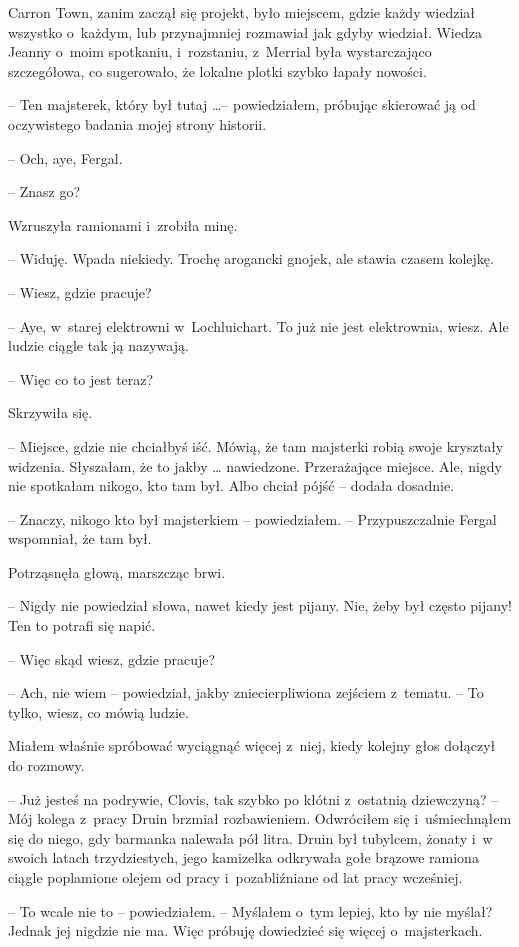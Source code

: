 \documentclass[oneside,polish,11pt,sfheadings]{mwbk}
\begin{document}
Carron Town, zanim zaczął się projekt, było miejscem, gdzie każdy
wiedział wszystko o~każdym, lub przynajmniej rozmawiał jak gdyby
wiedział. Wiedza Jeanny o~moim spotkaniu, i~rozstaniu, z~Merrial była
wystarczająco szczegółowa, co sugerowało, że lokalne plotki szybko
łapały nowości.

-- Ten majsterek, który był tutaj \ldots -- powiedziałem, próbując skierować
ją od oczywistego badania mojej strony historii.

-- Och, aye, Fergal.

-- Znasz go?

Wzruszyła ramionami i~zrobiła minę. 

-- Widuję. Wpada niekiedy. Trochę arogancki gnojek, ale stawia czasem kolejkę.

-- Wiesz, gdzie pracuje?

-- Aye, w~starej elektrowni w~Lochluichart. To już nie jest elektrownia,
wiesz. Ale ludzie ciągle tak ją nazywają.

-- Więc co to jest teraz?

Skrzywiła się. 

-- Miejsce, gdzie nie chciałbyś iść. Mówią, że tam
majsterki robią swoje kryształy widzenia. Słyszałam, że to jakby \ldots
nawiedzone. Przerażające miejsce. Ale, nigdy nie spotkałam nikogo, kto
tam był. Albo chciał pójść -- dodała dosadnie.

-- Znaczy, nikogo kto był majsterkiem -- powiedziałem. -- Przypuszczalnie
Fergal wspomniał, że tam był.

Potrząsnęła głową, marszcząc brwi. 

-- Nigdy nie powiedział słowa, nawet
kiedy jest pijany. Nie, żeby był często pijany! Ten to potrafi się
napić.

-- Więc skąd wiesz, gdzie pracuje?

-- Ach, nie wiem -- powiedział, jakby zniecierpliwiona zejściem z~tematu.
-- To tylko, wiesz, co mówią ludzie.

Miałem właśnie spróbować wyciągnąć więcej z~niej, kiedy kolejny głos
dołączył do rozmowy.

-- Już jesteś na podrywie, Clovis, tak szybko po kłótni z~ostatnią
dziewczyną? -- Mój kolega z~pracy Druin brzmiał rozbawieniem. Odwróciłem
się i~uśmiechnąłem się do niego, gdy barmanka nalewała pół litra. Druin
był tubylcem, żonaty i~w swoich latach trzydziestych, jego kamizelka
odkrywała gołe brązowe ramiona ciągle poplamione olejem od pracy i~pozabliźniane od lat pracy wcześniej.

-- To wcale nie to -- powiedziałem. -- Myślałem o~tym lepiej, kto by nie
myślał? Jednak jej nigdzie nie ma. Więc próbuję dowiedzieć się więcej o~majsterkach.
\end{document}
